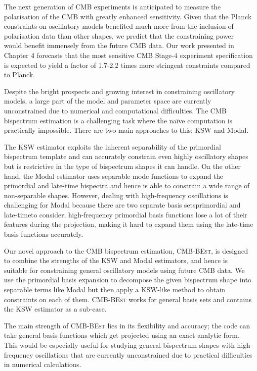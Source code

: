 The next generation of CMB experiments is anticipated to measure the polarisation of the CMB with greatly enhanced sensitivity. Given that the Planck constraints on oscillatory models benefited much more from the inclusion of polarisation data than other shapes, we predict that the constraining power would benefit immensely from the future CMB data. Our work presented in Chapter 4 forecasts that the most sensitive CMB Stage-4 experiment specification is expected to yield a factor of 1.7-2.2 times more stringent constraints compared to Planck.

Despite the bright prospects and growing interest in constraining oscillatory models, a large part of the model and parameter space are currently unconstrained due to numerical and computational difficulties. The CMB bispectrum estimation is a challenging task where the na\"ive computation is practically impossible. There are two main approaches to this: KSW and Modal.

The KSW estimator exploits the inherent separability of the primordial bispectrum template and can accurately constrain even highly oscillatory shapes but is restrictive in the type of bispectrum shapes it can handle. On the other hand, the Modal estimator uses separable mode functions to expand the primordial and late-time bispectra and hence is able to constrain a wide range of non-separable shapes. However, dealing with high-frequency oscillations is challenging for Modal because there are two separate basis sets\textemdash primordial and late-time\textemdash to consider; high-frequency primordial basis functions lose a lot of their features during the projection, making it hard to expand them using the late-time basis functions accurately.

Our novel approach to the CMB bispectrum estimation, \textsc{CMB-BEst}, is designed to combine the strengths of the KSW and Modal estimators, and hence is suitable for constraining general oscillatory models using future CMB data. We use the primordial basis expansion to decompose the given bispectrum shape into separable terms like Modal but then apply a KSW-like method to obtain constraints on each of them. \textsc{CMB-BEst} works for general basis sets and contains the KSW estimator as a sub-case.

The main strength of \textsc{CMB-BEst} lies in its flexibility and accuracy; the code can take general basis functions which get projected using an exact analytic form. This would be especially useful for studying general bispectrum shapes with high-frequency oscillations that are currently unconstrained due to practical difficulties in numerical calculations.

